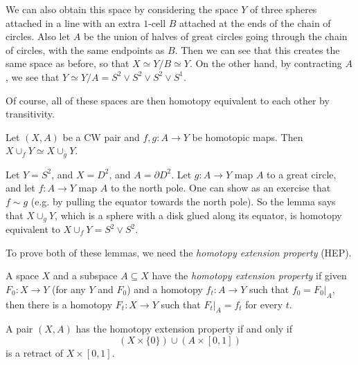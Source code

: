 \begin{exercise}
\begin{enumerate}
      We can also obtain this space by considering
      the space $Y$ of
      three spheres attached in a line with an extra
      $1$-cell $B$ attached at the ends of the chain
      of circles. Also let $A$ be the union of halves
      of great circles going through the chain of
      circles, with the same endpoints as $B$. Then
      we can see that this creates the same space as
      before, so that $X \simeq Y / B \simeq Y$.
      On the other hand, by contracting $A$, we see
      that $Y \simeq Y / A = S^2 \lor S^2 \lor S^2 \lor S^1$.

      Of course, all of these spaces are then homotopy
      equivalent to each other by transitivity.
  \end{enumerate}
\end{exercise}

\begin{lemma}\label{lem:lemma-3}
  Let $(X, A)$ be a CW pair and $f, g : A \to Y$ 
  be homotopic maps. Then $X \cup_f Y \simeq X \cup_g Y$.
\end{lemma}

\begin{example}
  Let $Y = S^2$, and $X = D^2$, and $A = \partial D^2$.
  Let $g : A \to Y$ map $A$ to a great circle, and
  let $f : A \to Y$ map $A$ to the north pole.
  One can show as an exercise that $f \sim g$ (e.g. by
  pulling the equator towards the north pole).
  So the lemma says that $X \cup_g Y$, which is a
  sphere with a disk glued along its equator, is homotopy
  equivalent to $X \cup_f Y = S^2 \lor S^2$.
\end{example}

\begin{remark}
  To prove both of these lemmas, we need the
  \emph{homotopy extension property} (HEP).
\end{remark}

\begin{definition}
  A space $X$ and a subspace $A \subseteq X$ have the
  \emph{homotopy extension property} if given
  $F_0 : X \to Y$ (for any $Y$ and $F_0$) and a
  homotopy $f_t : A \to Y$ such that $f_0 = F_0|_A$,
  then there is a homotopy $F_t : X \to Y$ such that
  $F_t|_A = f_t$ for every $t$.
\end{definition}

\begin{lemma}\label{lem:lemma-4}
  A pair $(X, A)$ has the homotopy extension property
  if and only if
  \[
    (X \times \{0\}) \cup (A \times [0, 1])
  \]
  is a retract of $X \times [0, 1]$.
\end{lemma}

